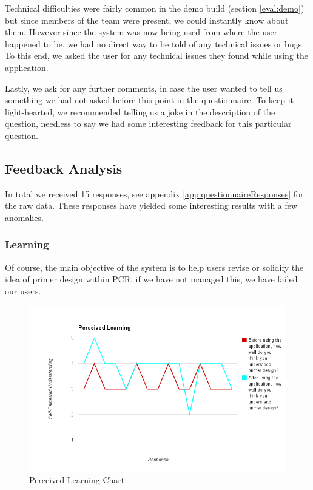 Technical difficulties were fairly common in the demo build (section
\ref{eval:demo}) but since members of the team were present, we could
instantly know about them.
However since the system was now being used from where the user
happened to be, we had no direct way to be told of any technical
issues or bugs.
To this end, we asked the user for any technical issues they found
while using the application.

Lastly, we ask for any further comments, in case the user wanted to
tell us something we had not asked before this point in the
questionnaire.
To keep it light-hearted, we recommended telling us a joke in the
description of the question, needless to say we had some interesting
feedback for this particular question.

\subsection{Feedback Analysis}

In total we received 15 responses, see appendix
\ref{app:questionnaireResponses} for the raw data.
These responses have yielded some interesting results with a few
anomalies.

\subsubsection{Learning}

Of course, the main objective of the system is to help users revise or
solidify the idea of primer design within PCR, if we have not managed
this, we have failed our users.

\begin{figure}[h]
  \begin{center}
    \includegraphics[width=\textwidth]{./images/perceivedLearning.png}
    \caption{Perceived Learning Chart}
    \label{fig:feedbackAnalysis:perceivedLearning}
  \end{center}
\end{figure}

